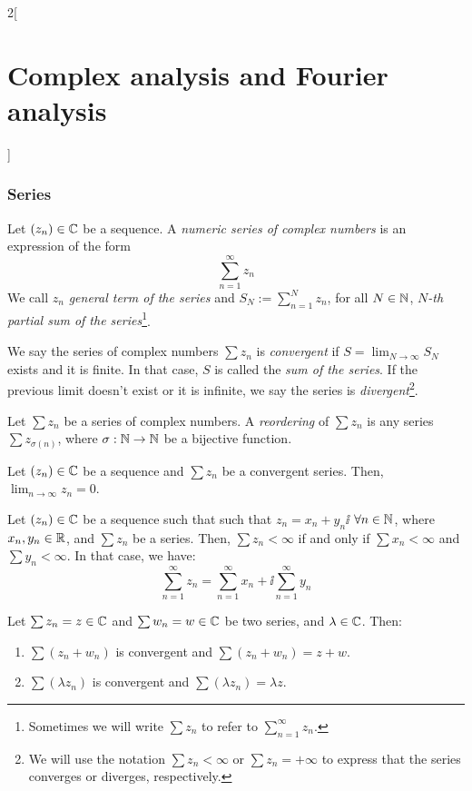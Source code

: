 \documentclass[../../../main.tex]{subfiles}
\begin{document}
\begin{multicols}{2}[\section{Complex analysis and Fourier analysis}]
  \subsubsection{Series}
  \begin{definition}
    Let $(z_n)\in\mathbb{C}$ be a sequence. A \emph{numeric series of complex numbers} is an expression of the form $$\sum_{n=1}^\infty z_n$$ We call $z_n$ \emph{general term of the series} and $\displaystyle S_N:=\sum_{n=1}^N z_n$, for all $N\in\mathbb{N} $, \emph{$N$-th partial sum of the series}\footnote{Sometimes we will write $\sum z_n$ to refer to $\displaystyle\sum_{n=1}^\infty z_n$.}.
  \end{definition}
  \begin{definition}
    We say the series of complex numbers $\sum z_n$ is \emph{convergent} if $\displaystyle S=\lim_{N\to\infty}S_N$ exists and it is finite. In that case, $S$ is called the \emph{sum of the series}. If the previous limit doesn't exist or it is infinite, we say the series is \emph{divergent}\footnote{We will use the notation $\sum z_n<\infty$ or $\sum z_n=+\infty$ to express that the series converges or diverges, respectively.}.
  \end{definition}
  \begin{definition}
    Let $\sum z_n$ be a series of complex numbers. A \emph{reordering} of $\sum z_n$ is any series $\sum z_{\sigma(n)}$, where $\sigma:\mathbb{N}\rightarrow\mathbb{N}$ be a bijective function.
  \end{definition}
  \begin{proposition}
    Let $(z_n)\in\mathbb{C}$ be a sequence and $\sum z_n$ be a convergent series. Then, $\displaystyle\lim_{n\to\infty}z_n =0$.
  \end{proposition}
  \begin{proposition}
    Let $(z_n)\in\mathbb{C}$ be a sequence such that such that $z_n=x_n+y_n\ii$ $\forall n\in\mathbb{N}$, where $x_n,y_n\in\mathbb{R}$, and $\sum z_n$ be a series. Then, $\sum z_n<\infty$ if and only if $\sum x_n<\infty$ and $\sum y_n<\infty$. In that case, we have: $$\sum_{n=1}^\infty z_n=\sum_{n=1}^\infty x_n+\ii\sum_{n=1}^\infty y_n$$
  \end{proposition}
  \begin{proposition}
    Let $\sum z_n=z\in\mathbb{C}$ and $\sum w_n=w\in\mathbb{C}$ be two series, and $\lambda\in\mathbb{C}$. Then:
    \begin{enumerate}
      \item $\sum (z_n+w_n)$ is convergent and $\sum (z_n+w_n)=z+w$.
      \item $\sum (\lambda z_n)$ is convergent and $\sum (\lambda z_n)=\lambda z$.

\end{enumerate}
\end{proposition}
\end{multicols}
\end{document}
